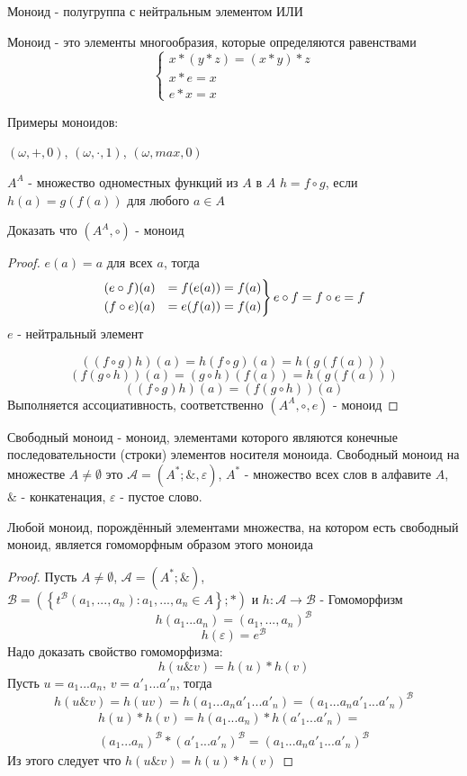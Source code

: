 \documentclass[../main/document.tex]{subfiles}
\begin{document}
\begin{dfn}
Моноид - полугруппа с нейтральным элементом ИЛИ

Моноид - это элементы многообразия, которые определяются равенствами
$$
\begin{cases}
x*(y*z)=(x*y)*z\\
x*e=x\\
e*x=x
\end{cases}$$
\end{dfn}
\begin{exm}
Примеры моноидов:

$(\omega,+,0)$, $(\omega,\cdot,1)$, $(\omega,max,0)$

$A^A$ - множество одноместных функций из $A$ в $A$
$h=f\circ g$, если $h(a)=g(f(a))$ для любого $a\in A$

Доказать что $(A^A,\circ)$ - моноид
\begin{proof}
$e(a)=a$ для всех $a$, тогда
\begin{equation*}
\begin{rcases}
(e\circ f)(a) &= f(e(a))= f(a) \\
(f\circ e)(a) &= e(f(a))= f(a) 
\end{rcases}
e\circ f=f\circ e=f
\end{equation*}
$e$ - нейтральный элемент

$$((f\circ g)h)(a)=h(f\circ g)(a)=h(g(f(a)))$$
$$(f(g\circ h))(a)=(g\circ h)(f(a))=h(g(f(a)))$$
$$((f\circ g)h)(a)=(f(g\circ h))(a)$$
Выполняется ассоциативность, соответственно $(A^A,\circ,e)$ - моноид

\end{proof}
\end{exm}
\begin{dfn}
Свободный моноид - моноид, элементами которого являются конечные последовательности (строки) элементов носителя моноида. Свободный моноид на множестве $A\neq \emptyset$ это $\mathcal{A}=(A^*;\&,\varepsilon)$, $A^*$ - множество всех слов в алфавите $A$, $\&$ - конкатенация, $\varepsilon$ - пустое слово.
\end{dfn}
\begin{thm}
Любой моноид, порождённый элементами множества, на котором есть свободный моноид, является гомоморфным образом этого моноида
\begin{proof}
Пусть $A\neq \emptyset$, $\mathcal{A}=(A^*;\&)$,\\ $\mathcal{B}=(\left\{t^{\mathcal{B}}(a_1,...,a_n): a_1,...,a_n\in A\right\};*)$ и $h:\mathcal{A}\rightarrow \mathcal{B}$ - Гомоморфизм
$$h(a_1...a_n)=(a_1,...,a_n)^{\mathcal{B}}$$
$$h(\varepsilon)=e^{\mathcal{B}}$$
Надо доказать свойство гомоморфизма:
$$h(u\&v)=h(u)*h(v)$$
Пусть $u=a_1...a_n$, $v={a'}_1...{a'}_n$, тогда
$$h(u\&v)=h(uv)=h(a_1...a_n{a'}_1...{a'}_n)=(a_1...a_n{a'}_1...{a'}_n)^{\mathcal{B}}$$
\begin{multline*}
h(u)*h(v)=h(a_1...a_n)*h({a'}_1...{a'}_n)=\\
(a_1...a_n)^{\mathcal{B}}*({a'}_1...{a'}_n)^{\mathcal{B}}=(a_1...a_n{a'}_1...{a'}_n)^{\mathcal{B}}
\end{multline*}
Из этого следует что $h(u\&v)=h(u)*h(v)$
\end{proof}
\end{thm}
\end{document}
